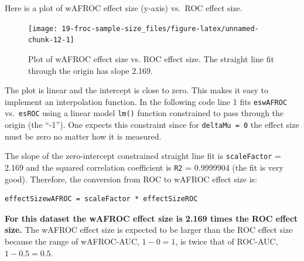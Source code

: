 \documentclass[
]{book}
\newenvironment{Shaded}{\begin{snugshade}}{\end{snugshade}}
\newcommand{\CommentTok}[1]{\textcolor[rgb]{0.56,0.35,0.01}{\textit{#1}}}
\newcommand{\DecValTok}[1]{\textcolor[rgb]{0.00,0.00,0.81}{#1}}
\newcommand{\FloatTok}[1]{\textcolor[rgb]{0.00,0.00,0.81}{#1}}
\newcommand{\FunctionTok}[1]{\textcolor[rgb]{0.00,0.00,0.00}{#1}}
\newcommand{\NormalTok}[1]{#1}
\newcommand{\OtherTok}[1]{\textcolor[rgb]{0.56,0.35,0.01}{#1}}
\newcommand{\SpecialCharTok}[1]{\textcolor[rgb]{0.00,0.00,0.00}{#1}}
\begin{document}
Here is a plot of wAFROC effect size (y-axis) vs.~ROC effect size.

\begin{figure}

{\centering \texttt{[image: 19-froc-sample-size\_files/figure-latex/unnamed-chunk-12-1]} 

}

\caption{Plot of wAFROC effect size vs. ROC effect size. The straight line fit through the origin has slope 2.169.}\label{fig:unnamed-chunk-12}
\end{figure}

The plot is linear and the intercept is close to zero. This makes it easy to implement an interpolation function. In the following code line 1 fits \texttt{eswAFROC} vs.~\texttt{esROC} using a linear model \texttt{lm()} function constrained to pass through the origin (the ``-1''). One expects this constraint since for \texttt{deltaMu\ =\ 0} the effect size must be zero no matter how it is measured.

\begin{Shaded}
\end{Shaded}

The slope of the zero-intercept constrained straight line fit is \texttt{scaleFactor} = 2.169 and the squared correlation coefficient is \texttt{R2} = 0.9999904 (the fit is very good). Therefore, the conversion from ROC to wAFROC effect size is:

\begin{verbatim}
effectSizewAFROC = scaleFactor * effectSizeROC
\end{verbatim}

\textbf{For this dataset the wAFROC effect size is 2.169 times the ROC effect size.} The wAFROC effect size is expected to be larger than the ROC effect size because the range of wAFROC-AUC, \(1-0=1\), is twice that of ROC-AUC, \(1-0.5=0.5\).
\end{document}
